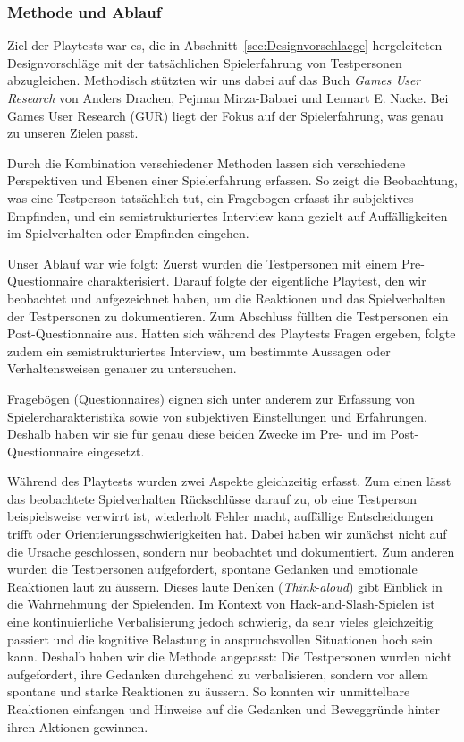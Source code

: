 \documentclass[../Main.tex]{subfiles}
\begin{document}
\subsubsection{Methode und Ablauf} \label{sec:MethodePlaytest}
Ziel der Playtests war es, die in Abschnitt~\ref{sec:Designvorschlaege} hergeleiteten Designvorschläge mit der tatsächlichen Spielerfahrung von Testpersonen abzugleichen. Methodisch stützten wir uns dabei auf das Buch \textit{Games User Research} von Anders Drachen, Pejman Mirza-Babaei und Lennart E. Nacke.\autocite{drachen2018gamesuserresearch} Bei Games User Research (GUR) liegt der Fokus auf der Spielerfahrung, was genau zu unseren Zielen passt.

Durch die Kombination verschiedener Methoden lassen sich verschiedene Perspektiven und Ebenen einer Spielerfahrung erfassen.\autocite[\textcolor{red}{S.~??}]{drachen2018gamesuserresearch} So zeigt die Beobachtung, was eine Testperson tatsächlich tut, ein Fragebogen erfasst ihr subjektives Empfinden, und ein semistrukturiertes Interview kann gezielt auf Auffälligkeiten im Spielverhalten oder Empfinden eingehen.

Unser Ablauf war wie folgt: Zuerst wurden die Testpersonen mit einem Pre-Questionnaire charakterisiert. Darauf folgte der eigentliche Playtest, den wir beobachtet und aufgezeichnet haben, um die Reaktionen und das Spielverhalten der Testpersonen zu dokumentieren. Zum Abschluss füllten die Testpersonen ein Post-Questionnaire aus. Hatten sich während des Playtests Fragen ergeben, folgte zudem ein semistrukturiertes Interview, um bestimmte Aussagen oder Verhaltensweisen genauer zu untersuchen.

Fragebögen (Questionnaires) eignen sich unter anderem zur Erfassung von Spielercharakteristika sowie von subjektiven Einstellungen und Erfahrungen.\autocite[\textcolor{red}{S.~??}]{drachen2018gamesuserresearch} Deshalb haben wir sie für genau diese beiden Zwecke im Pre- und im Post-Questionnaire eingesetzt.

Während des Playtests wurden zwei Aspekte gleichzeitig erfasst. Zum einen lässt das beobachtete Spielverhalten Rückschlüsse darauf zu, ob eine Testperson beispielsweise verwirrt ist, wiederholt Fehler macht, auffällige Entscheidungen trifft oder Orientierungsschwierigkeiten hat. Dabei haben wir zunächst nicht auf die Ursache geschlossen, sondern nur beobachtet und dokumentiert. Zum anderen wurden die Testpersonen aufgefordert, spontane Gedanken und emotionale Reaktionen laut zu äussern. Dieses laute Denken (\textit{Think-aloud}) gibt Einblick in die Wahrnehmung der Spielenden.\autocite[\textcolor{red}{S.~??}]{drachen2018gamesuserresearch} Im Kontext von Hack-and-Slash-Spielen ist eine kontinuierliche Verbalisierung jedoch schwierig, da sehr vieles gleichzeitig passiert und die kognitive Belastung in anspruchsvollen Situationen hoch sein kann. Deshalb haben wir die Methode angepasst: Die Testpersonen wurden nicht aufgefordert, ihre Gedanken durchgehend zu verbalisieren, sondern vor allem spontane und starke Reaktionen zu äussern. So konnten wir unmittelbare Reaktionen einfangen und Hinweise auf die Gedanken und Beweggründe hinter ihren Aktionen gewinnen.
\end{document}
